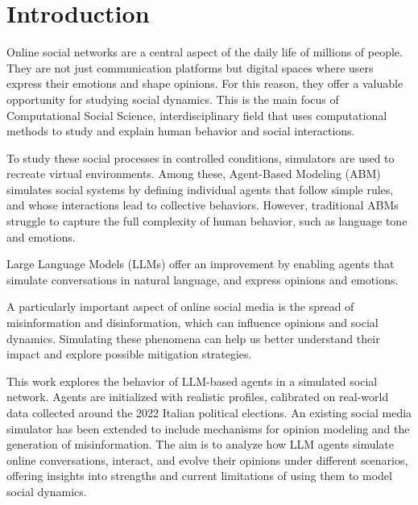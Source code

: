 \section{Introduction}
\label{sec:introduction}

Online social networks are a central aspect of the daily life of millions of people. They are not just communication platforms but digital spaces where users express their emotions and shape opinions.
For this reason, they offer a valuable opportunity for studying social dynamics.
This is the main focus of Computational Social Science, interdisciplinary field that uses computational methods to study and explain human behavior and social interactions.

To study these social processes in controlled conditions, simulators are used to recreate virtual environments.
Among these, Agent-Based Modeling (ABM) simulates social systems by defining individual agents that follow simple rules, and whose interactions lead to collective behaviors.
However, traditional ABMs struggle to capture the full complexity of human behavior, such as language tone and emotions.

Large Language Models (LLMs) offer an improvement by enabling agents that simulate conversations in natural language, and express opinions and emotions.

A particularly important aspect of online social media is the spread of misinformation and disinformation, which can influence opinions and social dynamics. 
Simulating these phenomena can help us better understand their impact and explore possible mitigation strategies.

This work explores the behavior of LLM-based agents in a simulated social network. 
Agents are initialized with realistic profiles, calibrated on real-world data collected around the 2022 Italian political elections. An existing social media simulator has been extended to include mechanisms for opinion modeling and the generation of misinformation. 
The aim is to analyze how LLM agents simulate online conversations, interact, and evolve their opinions under different scenarios, offering insights into strengths and current limitations of using them to model social dynamics.

